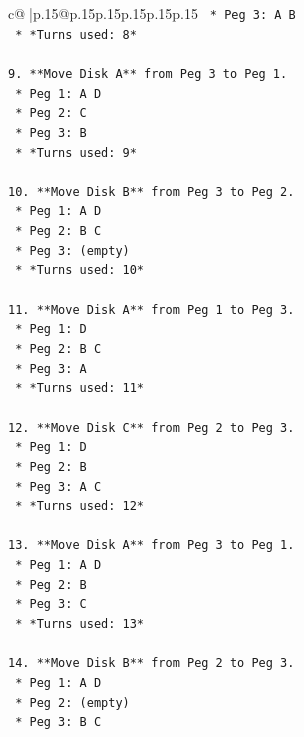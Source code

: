 \documentclass{article}
\begin{document}
{\begin{supertabular}{c@{$\;$}|p{.15\linewidth}@{}p{.15\linewidth}p{.15\linewidth}p{.15\linewidth}p{.15\linewidth}p{.15\linewidth}}
{{{\texttt{    *   Peg 3: A B} \\
\texttt{    *   *Turns used: 8*} \\
\\ 
\texttt{9.  **Move Disk A** from Peg 3 to Peg 1.} \\
\texttt{    *   Peg 1: A D} \\
\texttt{    *   Peg 2: C} \\
\texttt{    *   Peg 3: B} \\
\texttt{    *   *Turns used: 9*} \\
\\ 
\texttt{10. **Move Disk B** from Peg 3 to Peg 2.} \\
\texttt{    *   Peg 1: A D} \\
\texttt{    *   Peg 2: B C} \\
\texttt{    *   Peg 3: (empty)} \\
\texttt{    *   *Turns used: 10*} \\
\\ 
\texttt{11. **Move Disk A** from Peg 1 to Peg 3.} \\
\texttt{    *   Peg 1: D} \\
\texttt{    *   Peg 2: B C} \\
\texttt{    *   Peg 3: A} \\
\texttt{    *   *Turns used: 11*} \\
\\ 
\texttt{12. **Move Disk C** from Peg 2 to Peg 3.} \\
\texttt{    *   Peg 1: D} \\
\texttt{    *   Peg 2: B} \\
\texttt{    *   Peg 3: A C} \\
\texttt{    *   *Turns used: 12*} \\
\\ 
\texttt{13. **Move Disk A** from Peg 3 to Peg 1.} \\
\texttt{    *   Peg 1: A D} \\
\texttt{    *   Peg 2: B} \\
\texttt{    *   Peg 3: C} \\
\texttt{    *   *Turns used: 13*} \\
\\ 
\texttt{14. **Move Disk B** from Peg 2 to Peg 3.} \\
\texttt{    *   Peg 1: A D} \\
\texttt{    *   Peg 2: (empty)} \\
\texttt{    *   Peg 3: B C} \\
}}}
\end{supertabular}}
\end{document}
